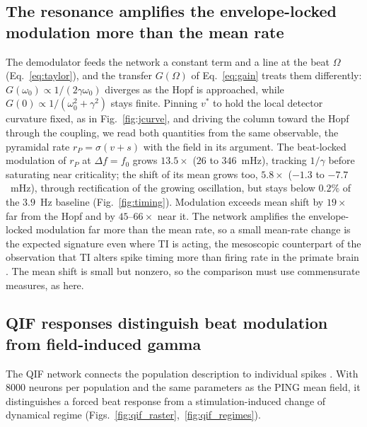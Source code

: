\documentclass[11pt,a4paper]{article}
\newcommand{\Sig}{\sigma}
\begin{document}
\subsection{The resonance amplifies the envelope-locked modulation more than the mean rate}\label{sec:timing}
The demodulator feeds the network a constant term and a line at the beat $\Omega$
(Eq.~\eqref{eq:taylor}), and the transfer $G(\Omega)$ of Eq.~\eqref{eq:gain} treats them
differently: $G(\omega_0)\propto1/(2\gamma\omega_0)$ diverges as the Hopf is approached,
while $G(0)\propto1/(\omega_0^2+\gamma^2)$ stays finite. Pinning $v^*$ to hold the local detector
curvature fixed, as in Fig.~\ref{fig:jcurve}, and driving the column toward the Hopf
through the coupling, we read both quantities from the same observable, the pyramidal
rate $r_P=\Sig(v+s)$ with the field in its argument. The beat-locked modulation of $r_P$ at
$\Delta f=f_0$ grows $13.5\times$ ($26$ to $346$~mHz), tracking $1/\gamma$ before
saturating near criticality; the shift of its mean grows too, $5.8\times$ ($-1.3$ to
$-7.7$~mHz), through rectification of the growing oscillation, but stays below $0.2\%$ of
the $3.9$~Hz baseline (Fig.~\ref{fig:timing}). Modulation exceeds mean shift by $19\times$
far from the Hopf and by $45$--$66\times$ near it. The network amplifies the
envelope-locked modulation far more than the mean rate, so a small mean-rate change is
the expected signature even where TI is acting, the mesoscopic counterpart of the
observation that TI alters spike timing more than firing rate in the primate brain
\cite{vieira2024}. The mean shift is small but nonzero, so the comparison must use
commensurate measures, as here.

\subsection{QIF responses distinguish beat modulation from field-induced gamma}\label{sec:qif}
The QIF network connects the population description to individual spikes
\cite{montbrio2015,ruffini2025rosetta,clusella2023}. With $8000$ neurons per population
and the same parameters as the PING mean field, it distinguishes a forced beat
response from a stimulation-induced change of dynamical regime
(Figs.~\ref{fig:qif_raster},~\ref{fig:qif_regimes}).
\end{document}
